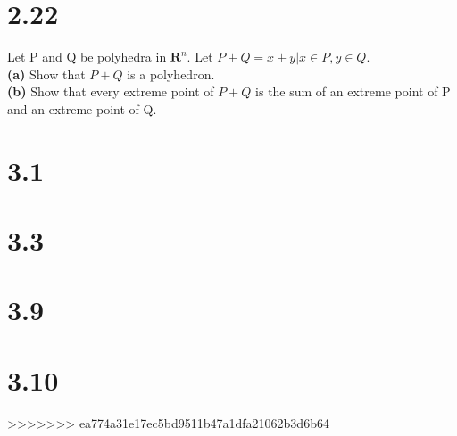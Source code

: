 \documentclass{article}
\begin{document}
\section{2.22}
Let P and Q be polyhedra in $\mathbf{R}^n$.  Let $P + Q = {x + y | x \in P, y \in Q}$.\\

\noindent \textbf{(a)} Show that $P + Q$ is a polyhedron.\\

\noindent \textbf{(b)} Show that every extreme point of $P + Q$ is the sum of an extreme point of P and an extreme point of Q.\\
\section{3.1}
\section{3.3}
\section{3.9}
\section{3.10}

>>>>>>> ea774a31e17ec5bd9511b47a1dfa21062b3d6b64
\end{document}
